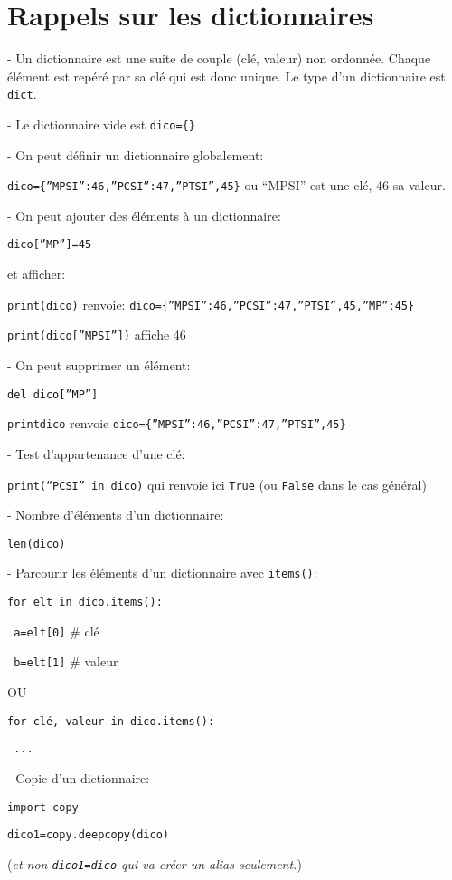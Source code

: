 \section*{Rappels sur les dictionnaires}

- Un dictionnaire est une suite de couple (clé, valeur) non ordonnée. Chaque élément est repéré par sa clé qui est donc unique. Le type d'un dictionnaire est \texttt{dict}.

- Le dictionnaire vide est \texttt{dico=\{\}}

- On peut définir un dictionnaire globalement:

\texttt{dico=\{”MPSI”:46,”PCSI”:47,”PTSI”,45\}}	ou “MPSI” est une clé, 46 sa valeur.

- On peut ajouter des éléments à un dictionnaire:

\texttt{dico[”MP”]=45}

et afficher:

\texttt{print(dico)} renvoie: \texttt{dico=\{”MPSI”:46,”PCSI”:47,”PTSI”,45,”MP”:45\}}

\texttt{print(dico[”MPSI”])} affiche 46

- On peut supprimer un élément:

\texttt{del dico[”MP”]}	

\texttt{print{dico}} renvoie \texttt{dico=\{”MPSI”:46,”PCSI”:47,”PTSI”,45\}}

 - Test d'appartenance d'une clé:

\texttt{print(“PCSI” in dico)} qui renvoie ici \texttt{True} (ou \texttt{False} dans le cas général)

- Nombre d'éléments d'un dictionnaire:

\texttt{len(dico)}

- Parcourir les éléments d'un dictionnaire avec \texttt{items()}:

\texttt{for elt in dico.items():}

\texttt{\ \qquad  a=elt[0]}  \# clé

\texttt{\ \qquad  b=elt[1]}   \# valeur

OU

\texttt{for clé, valeur in dico.items():}	

\texttt{\ \qquad  ...}

- Copie d'un dictionnaire:

\texttt{import copy}

\texttt{dico1=copy.deepcopy(dico)}	

(\textit{et non \texttt{dico1=dico} qui va créer un alias seulement.})


